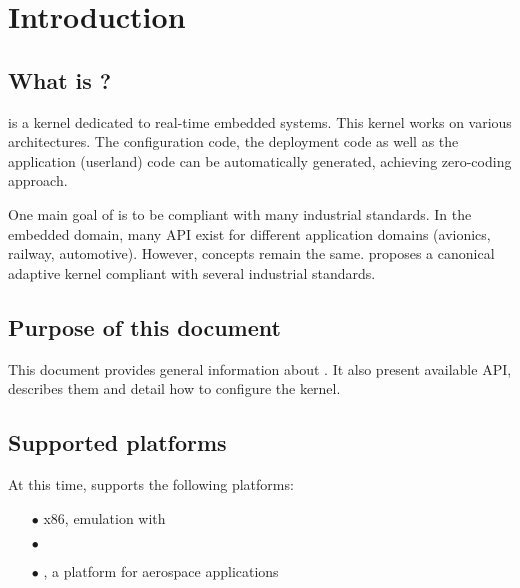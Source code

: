 %
%
%
%
%

\chapter{Introduction}

   \section{What is \pok ?}
   \pok is a kernel dedicated to real-time embedded systems. This kernel works on
   various architectures. The configuration code, the deployment code as well as
   the application (userland) code can be automatically generated, achieving
   zero-coding approach.

   One main goal of \pok is to be compliant with many industrial standards. In
   the embedded domain, many API exist for different application domains
   (avionics, railway, automotive). However, concepts remain the same. \pok 
   proposes a canonical adaptive kernel compliant with several industrial
   standards.

   \section{Purpose of this document}
   This document provides general information about \pok. It also present
   available API, describes them and detail how to configure the kernel.

   \section{Supported platforms}
   At this time, \pok supports the following platforms:
   \begin{itemize}
      \item[$\bullet$]
         x86, emulation with \qemu
      \item[$\bullet$]
         \powerpc
      \item[$\bullet$]
         \leon, a platform for aerospace applications
   \end{itemize}

